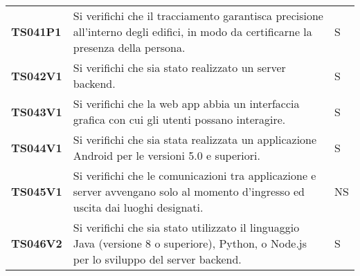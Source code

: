 \documentclass[../../piano-di-qualifica.tex]{subfiles}
\begin{document}
\begin{longtable}[H]{>{\centering\bfseries}m{3cm} >{}m{10cm} >{\centering\arraybackslash}m{3cm}}

  TS041P1            & Si verifichi che il tracciamento garantisca precisione all'interno degli edifici, in modo da certificarne la presenza della persona.
                     & S                                                                                                                                                                                                                                                   \\

  TS042V1            & Si verifichi che sia stato realizzato un server backend.
                     & S                                                                                                                                                                                                                                                   \\

  TS043V1            & Si verifichi che la web app abbia un interfaccia grafica con cui gli utenti possano interagire.
                     & S                                                                                                                                                                                                                                                   \\

  TS044V1            & Si verifichi che sia stata realizzata un applicazione Android per le versioni 5.0 e superiori.
                     & S                                                                                                                                                                                                                                                   \\

  TS045V1            & Si verifichi che le comunicazioni tra applicazione e server avvengano solo al momento d'ingresso ed uscita dai luoghi designati.
                     & NS                                                                                                                                                                                                                                                  \\

  TS046V2            & Si verifichi che sia stato utilizzato il linguaggio Java (versione 8 o superiore), Python, o Node.js per lo sviluppo del server backend.
                     & S                                                                                                                                                                                                                                                   \\


\end{longtable}
\end{document}
